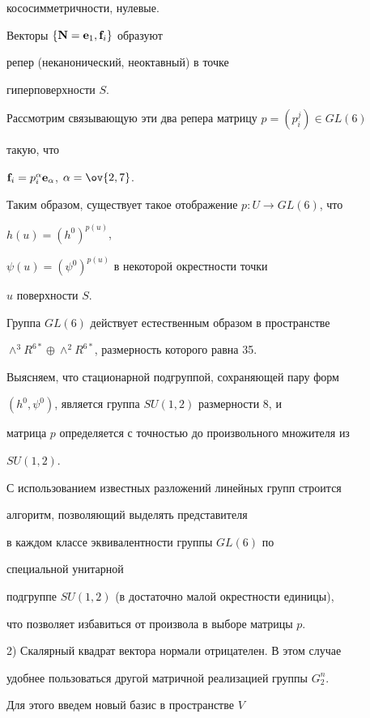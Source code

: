 кососимметричности, нулевые.





Векторы $\{\bold{N}=\bold{e}_1, \bold{f}_i\}$ образуют


репер (неканонический, неоктавный) в точке


гиперповерхности $S$.


Рассмотрим связывающую эти два репера матрицу $p=(p_i^j)\in GL(6)$


такую, что


$\bold{f}_i=p_{i}^{\alpha }\bold{e}_{\alpha }$, $\alpha =\ov{2,7}$.


Таким образом, существует такое отображение $p:U\to GL(6)$, что


$h(u)=(h^0)^{p(u)}$,


$\psi (u)=(\psi ^0)^{p(u)}$ в некоторой окрестности точки


$u$ поверхности $S$.


Группа $GL(6)$ действует естественным образом в пространстве


$\wedge ^3 R^{6*}\oplus


\wedge ^2 R^{6*}$, размерность которого равна 35.


Выясняем, что стационарной подгруппой, сохраняющей пару форм


$(h^0, \psi ^0)$, является группа $SU(1,2)$ размерности 8, и


матрица $p$ определяется с точностью до произвольного множителя из


$SU(1,2)$.





С использованием известных разложений линейных групп строится


алгоритм, позволяющий выделять представителя


в каждом классе эквивалентности группы $GL(6)$ по


специальной унитарной


подгруппе $SU(1,2)$ (в достаточно малой окрестности единицы),


что позволяет избавиться от произвола в выборе матрицы $p$.





2) Скалярный квадрат вектора нормали отрицателен. В этом случае


удобнее пользоваться другой матричной реализацией группы $G_2^n$.


Для этого введем новый базис в пространстве $V$


